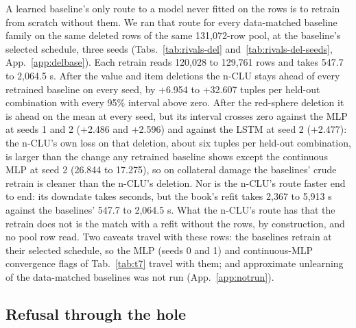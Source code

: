 \documentclass{article} %
\begin{document}
A learned baseline's only route to a model never fitted on the rows is to retrain from scratch without them. We ran
that route for every data-matched baseline family on the same deleted rows of the same 131,072-row %
pool, at the baseline's selected schedule, three seeds (Tabs.~\ref{tab:rivals-del}
and~\ref{tab:rivals-del-seeds}, App.~\ref{app:delbase}). Each retrain reads 120,028 to 129,761 %
rows and takes 547.7 to 2,064.5 s. After the value and item deletions the n-CLU stays ahead of every %
retrained baseline on every seed, by +6.954 to +32.607 tuples per held-out combination with every 95\% interval above %
zero. After the red-sphere deletion it is ahead on the mean at every seed, but its interval crosses
zero against the MLP at seeds 1 and 2 (+2.486 and +2.596) and against the LSTM at seed 2 %
(+2.477): the n-CLU's own loss on that deletion, about six tuples per held-out combination, is larger than the %
change any retrained baseline shows except the continuous MLP at seed 2 (26.844 to 17.275), so on %
collateral damage the baselines' crude retrain is cleaner than the n-CLU's deletion. Nor is the
n-CLU's route faster end to end: its downdate takes seconds, but the book's refit takes 2,367 to %
5,913 s against the baselines' 547.7 to 2,064.5 s. What the n-CLU's route has that the retrain does not %
is the match with a refit without the rows, by construction, and no pool row read. Two caveats travel with these rows: the baselines
retrain at their selected schedule, so the MLP (seeds 0 and 1) and continuous-MLP convergence flags
of Tab.~\ref{tab:t7} travel with them; and approximate unlearning of the data-matched baselines was not
run (App.~\ref{app:notrun}).

\subsection{Refusal through the hole}
\label{sec:hole}
\end{document}
